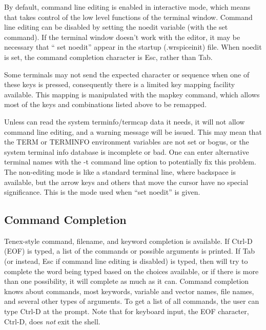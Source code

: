 By default, command line editing is enabled in interactive mode, which
means that {\WRspice} takes control of the low level functions of the
terminal window.  Command line editing can be disabled by setting the
{\et noedit} variable (with the {\cb set} command).  If the terminal
window doesn't work with the editor, it may be necessary that ``{\vt
set noedit}'' appear in the {\WRspice} startup ({\vt .wrspiceinit})
file.  When {\et noedit} is set, the command completion character is
{\kb Esc}, rather than {\kb Tab}.

Some terminals may not send the expected character or sequence when
one of these keys is pressed, consequently there is a limited key
mapping facility available.  This mapping is manipulated with the {\cb
mapkey} command, which allows most of the keys and combinations listed
above to be remapped.

Unless {\WRspice} can read the system terminfo/termcap data it needs,
it will not allow command line editing, and a warning message will be
issued.  This may mean that the {\et TERM} or {\et TERMINFO}
environment variables are not set or bogus, or the system terminal
info database is incomplete or bad.  One can enter alternative
terminal names with the {\vt -t} command line option to potentially
fix this problem.  The non-editing mode is like a standard terminal
line, where backspace is available, but the arrow keys and others that
move the cursor have no special significance.  This is the mode used
when ``{\vt set noedit}'' is given.

\subsection{Command Completion}


Tenex-style command, filename, and keyword completion is available.
If {\kb Ctrl-D} (EOF) is typed, a list of the commands or possible
arguments is printed.  If {\kb Tab} (or instead, {\kb Esc} if command
line editing is disabled) is typed, then {\WRspice} will try to
complete the word being typed based on the choices available, or if
there is more than one possibility, it will complete as much as it
can.  Command completion knows about commands, most keywords, variable
and vector names, file names, and several other types of arguments. 
To get a list of all commands, the user can type {\kb Ctrl-D} at the
{\WRspice} prompt.  Note that for keyboard input, the {\vt EOF}
character, {\kb Ctrl-D}, does {\it not} exit the shell.

